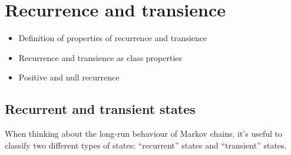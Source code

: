 \documentclass[
  a4paper,
]{article}
\providecommand{\tightlist}{%
  \setlength{\itemsep}{0pt}\setlength{\parskip}{0pt}}
\theoremstyle{definition}
\theoremstyle{definition}
\theoremstyle{definition}
\theoremstyle{remark}
\begin{document}
\hypertarget{S09-recurrence-transience}{%
\section{Recurrence and transience}\label{S09-recurrence-transience}}

\begin{itemize}
\tightlist
\item
  Definition of properties of recurrence and transience
\item
  Recurrence and transience as class properties
\item
  Positive and null recurrence
\end{itemize}

\hypertarget{rec-trans-def}{%
\subsection{Recurrent and transient states}\label{rec-trans-def}}

When thinking about the long-run behaviour of Markov chains, it's useful to classify two different types of states: ``recurrent'' states and ``transient'' states.
\end{document}
